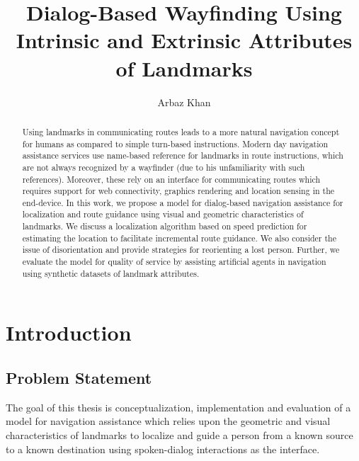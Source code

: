 \documentclass{iitkthesis}
\begin{document}
\title{Dialog-Based Wayfinding Using Intrinsic and Extrinsic Attributes of Landmarks}

\author{Arbaz Khan}
\dissertation
\maketitle
\makecertificate
\begin{abstract}
Using landmarks in communicating routes leads to a more natural 
navigation concept for humans as compared to simple turn-based 
instructions. Modern day navigation assistance services use name-based 
reference for landmarks in route instructions, which are not always 
recognized by a wayfinder (due to his unfamiliarity with such references).
Moreover, these rely on an interface for communicating routes which 
requires support for web connectivity, graphics rendering and location 
sensing in the end-device. In this work, we propose a model for dialog-based 
navigation assistance for localization and route guidance using visual 
and geometric characteristics of landmarks. We discuss a localization 
algorithm based on speed prediction for estimating the location to 
facilitate incremental route guidance. We also consider the issue of 
disorientation and provide strategies for reorienting a lost person. 
Further, we evaluate the model for quality of service by assisting 
artificial agents in navigation using synthetic datasets of landmark 
attributes.
\end{abstract}
\tableofcontents
\chapter{Introduction}
\section{Problem Statement}
The goal of this thesis is conceptualization, implementation and evaluation of a model for navigation assistance which relies upon the geometric and visual characteristics of landmarks to localize and guide a person from a known source to a known destination using spoken-dialog interactions as the interface.
\end{document}
